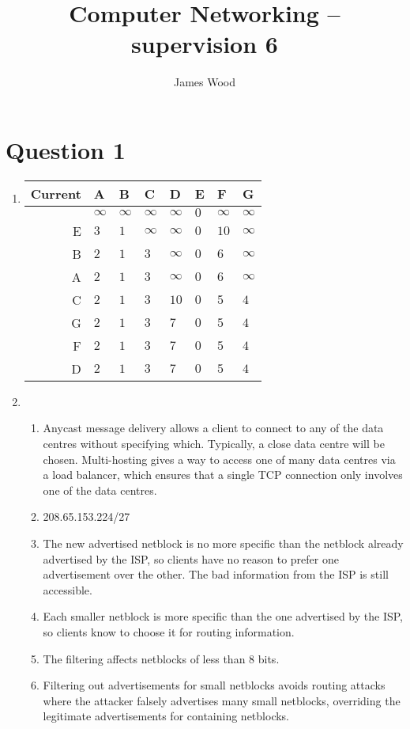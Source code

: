 \documentclass{article}
\begin{document}
\title{Computer Networking -- supervision 6}
\author{James Wood}
\maketitle

\section*{Question 1}
\begin{enumerate}
  \item
    \begin{tabular}[t]{r|l|l|l|l|l|l|l}
      Current & A & B & C & D & E & F & G
      \\ \hline
        & $\infty$ & $\infty$ & $\infty$ & $\infty$ & $0$ & $\infty$ & $\infty$
      \\
      E & $3$ & $1$ & $\infty$ & $\infty$ & $0$ & $10$ & $\infty$
      \\
      B & $2$ & $1$ & $3$ & $\infty$ & $0$ & $6$ & $\infty$
      \\
      A & $2$ & $1$ & $3$ & $\infty$ & $0$ & $6$ & $\infty$
      \\
      C & $2$ & $1$ & $3$ & $10$ & $0$ & $5$ & $4$
      \\
      G & $2$ & $1$ & $3$ & $7$ & $0$ & $5$ & $4$
      \\
      F & $2$ & $1$ & $3$ & $7$ & $0$ & $5$ & $4$
      \\
      D & $2$ & $1$ & $3$ & $7$ & $0$ & $5$ & $4$
      \\
    \end{tabular}
  \item
    \begin{enumerate}
      \item Anycast message delivery allows a client to connect to any of the data centres without specifying which. Typically, a close data centre will be chosen. Multi-hosting gives a way to access one of many data centres via a load balancer, which ensures that a single TCP connection only involves one of the data centres.
      \item 208.65.153.224/27
      \item The new advertised netblock is no more specific than the netblock already advertised by the ISP, so clients have no reason to prefer one advertisement over the other. The bad information from the ISP is still accessible.
      \item Each smaller netblock is more specific than the one advertised by the ISP, so clients know to choose it for routing information.
      \item The filtering affects netblocks of less than 8 bits.
      \item Filtering out advertisements for small netblocks avoids routing attacks where the attacker falsely advertises many small netblocks, overriding the legitimate advertisements for containing netblocks.
    \end{enumerate}
\end{enumerate}
\end{document}
